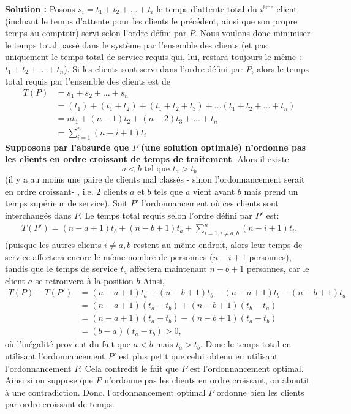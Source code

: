 \documentclass[11pt]{article} %
\newenvironment{solution}[1][\unskip]{%
	\par
	\noindent
	\textbf{Solution #1:}
	\noindent}
{\medskip}
\begin{document}
\begin{solution}
		Posons $s_i=t_1 + t_2 + \dots + t_i$ le temps d'attente total du $i^{\text{ème}}$ client  (incluant le temps d'attente pour les clients le précédent, ainsi que son propre temps au comptoir) servi selon l'ordre défini par $P$. Nous voulons donc minimiser le temps total passé dans le système par l'ensemble des clients (et pas uniquement le temps total de service requis qui, lui, restara toujours le même : $t_1+t_2 + \dots + t_n$). Si les clients sont servi dans l'ordre défini par $P$, alors le temps total requis par l'ensemble des clients est de
		\begin{align*}
		T(P)&=s_1 + s_2 + ... + s_n\\
		&= (t_1) + (t_1 + t_2)+ (t_1+t_2+t_3) + \dots (t_1+t_2 + \dots + t_n)\\
		&=nt_1 + (n-1)t_2 + (n-2)t_3 + ... + t_n\\
		&=\sum_{i=1}^n(n-i+1)t_i
		\end{align*}
		\textbf{Supposons par l'absurde que $P$ (une solution optimale) n'ordonne pas les clients en ordre croissant de temps de traitement}. Alors il existe 
		$$a < b \text{ tel que }t_a > t_b$$ 
		(il y a au moins une paire de clients mal classés - sinon l'ordonnancement serait en ordre croissant- , i.e. 2 clients $a$ et $b$ tels que $a$ vient avant $b$ mais prend un temps supérieur de service). Soit $P'$ l'ordonnancement où ces clients sont interchangés dans $P$. Le temps total requis selon l'ordre défini par $P'$ est:
		\begin{align*}
		T(P')=(n-a+1)t_b + (n-b+1)t_a + \sum_{i=1, i\neq a,b}^n (n-i+1)t_i.
		\end{align*}
		(puisque les autres clients $i\neq a, b$ restent au même endroit, alors leur temps de service affectera encore le même nombre de personnes ($n-i+1$ personnes), tandis que le temps de service $t_a$ affectera maintenant $n-b+1$ personnes, car le client $a$ se retrouvera à la position $b$ Ainsi,
		\begin{align*}
		T(P)-T(P')
		&= (n-a+1)t_a + (n-b+1)t_b - (n-a+1)t_b - (n-b+1)t_a\\
		&= (n-a+1)(t_a - t_b) + (n-b+1)(t_b - t_a)\\
		&= (n-a+1)(t_a - t_b) - (n-b+1)(t_a - t_b)\\
		&=(b-a)(t_a - t_b) > 0,
		\end{align*}
		où l'inégalité provient du fait que $a<b$ mais $t_a>t_b$.
		Donc le temps total en utilisant l'ordonnancement $P'$ est plus petit que celui obtenu en utilisant l'ordonnancement $P$. Cela contredit le fait que $P$ est l'ordonnancement optimal. Ainsi si on suppose que $P$ n'ordonne pas les clients en ordre croissant, on aboutit à une contradiction. Donc, l'ordonnancement optimal $P$ ordonne bien les clients par ordre croissant de temps.
	\end{solution}
	
\end{document}
